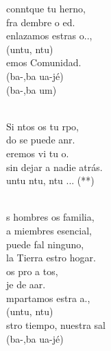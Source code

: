 \begin{cancion}
	 conntque tu herno, \\
	fra dembre o ed. \\
	 enlazamos estras o..,\\
	(untu, ntu)\\
	emos Comunidad.\\
	(ba-,ba ua-jé)\\
	(ba-,ba um)\\\jump\\
	\begin{chorus}%
	Si ntos os tu rpo,\\
	do se puede anr.\\
	eremos vi tu o. \\
sin dejar a nadie atrás.\\
	untu ntu, ntu ... (**)\\
	\end{chorus}%
	\jump\\
	s hombres os familia, \\
	a miembres esencial,\\
	 puede fal ninguno, \\
	la Tierra estro hogar.\\
	os pro a tos,\\
	je de aar.\\
	mpartamos estra a.,\\
	(untu, ntu)\\
	stro tiempo, nuestra sal \\
	(ba-,ba ua-jé)\\

\end{cancion}
